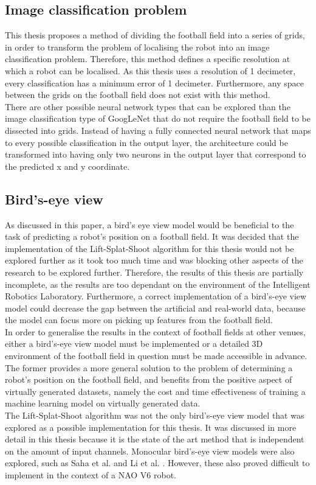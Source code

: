 \documentclass{uva-inf-bachelor-thesis}
\begin{document}
        \subsection{Image classification problem}
            This thesis proposes a method of dividing the football field into a series of grids, in order to transform the problem of localising the robot into an image classification problem. Therefore, this method defines a specific resolution at which a robot can be localised. As this thesis uses a resolution of 1 decimeter, every classification has a minimum error of 1 decimeter. Furthermore, any space between the grids on the football field does not exist with this method. \\
            There are other possible neural network types that can be explored than the image classification type of GoogLeNet that do not require the football field to be dissected into grids. Instead of having a fully connected neural network that maps to every possible classification in the output layer, the architecture could be transformed into having only two neurons in the output layer that correspond to the predicted x and y coordinate.
            
        \subsection{Bird's-eye view}
            As discussed in this paper, a bird's eye view model would be beneficial to the task of predicting a robot's position on a football field. It was decided that the implementation of the Lift-Splat-Shoot algorithm for this thesis would not be explored further as it took too much time and was blocking other aspects of the research to be explored further. Therefore, the results of this thesis are partially incomplete, as the results are too dependant on the environment of the Intelligent Robotics Laboratory. Furthermore, a correct implementation of a bird's-eye view model could decrease the gap between the artificial and real-world data, because the model can focus more on picking up features from the football field. \\
            In order to generalise the results in the context of football fields at other venues, either a bird's-eye view model must be implemented or a detailed 3D environment of the football field in question must be made accessible in advance. The former provides a more general solution to the problem of determining a robot's position on the football field, and benefits from the positive aspect of virtually generated datasets, namely the cost and time effectiveness of training a machine learning model on virtually generated data.  
            \hfill \break \\
            The Lift-Splat-Shoot algorithm was not the only bird's-eye view model that was explored as a possible implementation for this thesis. It was discussed in more detail in this thesis because it is the state of the art method that is independent on the amount of input channels. Monocular bird's-eye view models were also explored, such as Saha et al. \cite{tomaps} and Li et al. \cite{bimap}. However, these also proved difficult to implement in the context of a NAO V6 robot.
\end{document}

